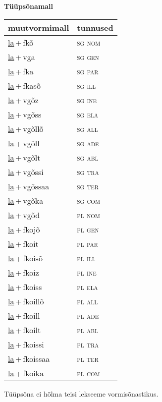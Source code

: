 
\vspace{1.8em}
\begin{minipage}{\textwidth}
\textbf{Tüüpsõnamall \,}\\

\begin{sideways}
\begin{tabular}{l l}
muutvormimall & tunnused \\
\hline
\underline{la}\,+\,fkõ & \textsc{ sg nom } \\
\underline{la}\,+\,vga & \textsc{ sg gen } \\
\underline{la}\,+\,fka & \textsc{ sg par } \\
\underline{la}\,+\,fkasõ & \textsc{ sg ill } \\
\underline{la}\,+\,vgõz & \textsc{ sg ine } \\
\underline{la}\,+\,vgõss & \textsc{ sg ela } \\
\underline{la}\,+\,vgõllõ & \textsc{ sg all } \\
\underline{la}\,+\,vgõll & \textsc{ sg ade } \\
\underline{la}\,+\,vgõlt & \textsc{ sg abl } \\
\underline{la}\,+\,vgõssi & \textsc{ sg tra } \\
\underline{la}\,+\,vgõssaa & \textsc{ sg ter } \\
\underline{la}\,+\,vgõka & \textsc{ sg com } \\
\underline{la}\,+\,vgõd & \textsc{ pl nom } \\
\underline{la}\,+\,fkojõ & \textsc{ pl gen } \\
\underline{la}\,+\,fkoit & \textsc{ pl par } \\
\underline{la}\,+\,fkoisõ & \textsc{ pl ill } \\
\underline{la}\,+\,fkoiz & \textsc{ pl ine } \\
\underline{la}\,+\,fkoiss & \textsc{ pl ela } \\
\underline{la}\,+\,fkoillõ & \textsc{ pl all } \\
\underline{la}\,+\,fkoill & \textsc{ pl ade } \\
\underline{la}\,+\,fkoilt & \textsc{ pl abl } \\
\underline{la}\,+\,fkoissi & \textsc{ pl tra } \\
\underline{la}\,+\,fkoissaa & \textsc{ pl ter } \\
\underline{la}\,+\,fkoika & \textsc{ pl com } \\
\end{tabular}
\end{sideways}
\label{tab:tüüpsõnamall-lafkõ}

\end{minipage}

 
\vspace{1em}
\noindent Tüüpsõna ei hõlma teisi lekseeme vormi\-sõnastikus.
